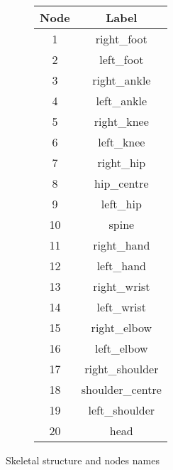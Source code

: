 \begin{figure}[H]
\begin{subfigure}[b]{0.7\linewidth}
  \end{subfigure}
  \label{fig:graph_skeletal}
  \begin{subfigure}[b]{0.29\linewidth}
    \centering
    \begin{table}[H]
      \centering
      \begin{tabular}{|c|c|}
        \hline
        \textbf{Node} & \textbf{Label} \\
        \hline
        1 & right\_foot \\
        2 & left\_foot \\
        3 & right\_ankle \\
        4 & left\_ankle \\
        5 & right\_knee \\
        6 & left\_knee \\
        7 & right\_hip \\
        8 & hip\_centre \\
        9 & left\_hip \\
        10 & spine \\
        11 & right\_hand \\
        12 & left\_hand \\
        13 & right\_wrist \\
        14 & left\_wrist \\
        15 & right\_elbow \\
        16 & left\_elbow \\
        17 & right\_shoulder \\
        18 & shoulder\_centre \\
        19 & left\_shoulder \\
        20 & head \\
        \hline
      \end{tabular}
    \end{table}
  \end{subfigure}
  \caption{Skeletal structure and nodes names}
  \label{tab:labels_joints}
\end{figure}



